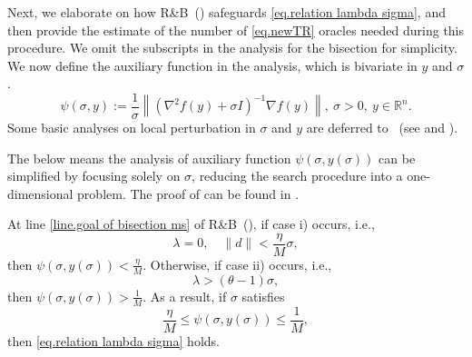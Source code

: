 \documentclass[moor,sglanonrev]{informs4}
\begin{document}
\subsubsection{}\label{sec.validty of bisection}
Next, we elaborate on how R\&B~() safeguards \eqref{eq.relation lambda sigma}, and then provide the estimate of the number of \ref{eq.newTR} oracles needed during this procedure. We omit the subscripts in the analysis for the bisection for simplicity. We now define the auxiliary function in the analysis, which is bivariate in $y$ and $\sigma$.
\begin{equation}
    \label{eq.linesearch quantity}
    \psi(\sigma,y) := \frac{1}{\sigma}\left \| \left(\nabla^2 f(y)+\sigma I \right)^{-1}\nabla f(y)\right \|, \ \sigma>0, \ y\in\mathbb{R}^n.
\end{equation}
Some basic analyses on local perturbation in $\sigma$ and $y$ are deferred to ~(see  and ).

The below  means the analysis of auxiliary function $\psi(\sigma,y(\sigma))$ can be simplified by focusing solely on $\sigma$, reducing the search procedure into a one-dimensional problem. The proof of  can be found in .
\begin{lemma}
    \label{lem.reduce line search}
    At line \ref{line.goal of bisection ms} of \textnormal{R\&B}~(), if case i) occurs, i.e.,
    \begin{equation}
        \label{eq.bracket small lambda}
        \lambda = 0, \quad \|d\|<\frac{\eta}{M}\sigma,
    \end{equation}
    then $\psi(\sigma,y(\sigma))<\frac{\eta}{M}$.  Otherwise, if case ii) occurs, i.e.,
    \begin{equation}
        \label{eq.bracket big lambda}
        \lambda > (\theta-1)\sigma,
    \end{equation}
    then $\psi(\sigma,y(\sigma))>\frac{1}{M}$. As a result, if $\sigma$ satisfies
    \begin{equation}
        \label{eq.reduce line search interval}
        \frac{\eta}{M}\leq \psi(\sigma,y(\sigma)) \leq \frac{1}{M},
    \end{equation}
    then \eqref{eq.relation lambda sigma} holds.
\end{lemma}
\end{document}
